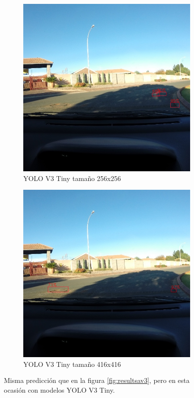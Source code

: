 \begin{figure}[H]
	\centering
	\begin{subfigure}[h]{0.45\linewidth}
		\includegraphics[width=\linewidth]{images/results_a_yolo_v3_tiny_256.jpg}
		\caption{YOLO V3 Tiny tamaño 256x256}
	\end{subfigure}
	\begin{subfigure}[h]{0.45\linewidth}
		\includegraphics[width=\linewidth]{images/results_a_yolo_v3_tiny_416.jpg}
		\caption{YOLO V3 Tiny tamaño 416x416}
	\end{subfigure}
	\caption{Misma predicción que en la figura \ref{fig:resultsav3}, pero en esta ocasión con modelos YOLO V3 Tiny.}
	\label{fig:resultsav3tiny}
\end{figure}

